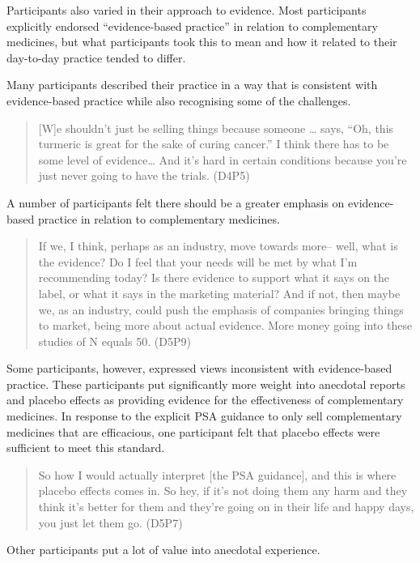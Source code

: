 \documentclass[12pt,]{article}
\begin{document}
Participants also varied in their approach to evidence. Most
participants explicitly endorsed ``evidence-based practice'' in relation
to complementary medicines, but what participants took this to mean and
how it related to their day-to-day practice tended to differ.

Many participants described their practice in a way that is consistent
with evidence-based practice while also recognising some of the
challenges.

\begin{quote}
{[}W{]}e shouldn't just be selling things because someone \ldots{} says,
``Oh, this turmeric is great for the sake of curing cancer.'' I think
there has to be some level of evidence\ldots{} And it's hard in certain
conditions because you're just never going to have the trials. (D4P5)
\end{quote}

A number of participants felt there should be a greater emphasis on
evidence-based practice in relation to complementary medicines.

\begin{quote}
If we, I think, perhaps as an industry, move towards more-- well, what
is the evidence? Do I feel that your needs will be met by what I'm
recommending today? Is there evidence to support what it says on the
label, or what it says in the marketing material? And if not, then maybe
we, as an industry, could push the emphasis of companies bringing things
to market, being more about actual evidence. More money going into these
studies of N equals 50. (D5P9)
\end{quote}

Some participants, however, expressed views inconsistent with
evidence-based practice. These participants put significantly more
weight into anecdotal reports and placebo effects as providing evidence
for the effectiveness of complementary medicines. In response to the
explicit PSA guidance to only sell complementary medicines that are
efficacious, one participant felt that placebo effects were sufficient
to meet this standard.

\begin{quote}
So how I would actually interpret {[}the PSA guidance{]}, and this is
where placebo effects comes in. So hey, if it's not doing them any harm
and they think it's better for them and they're going on in their life
and happy days, you just let them go. (D5P7)
\end{quote}

Other participants put a lot of value into anecdotal experience.
\end{document}
